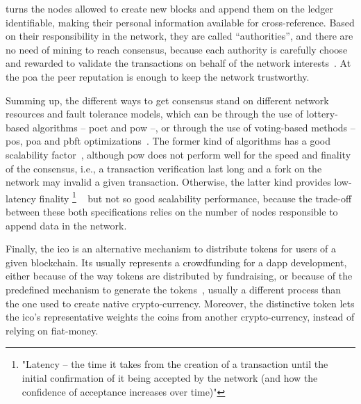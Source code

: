 \begin{description}[font={\normalfont\bfseries}]
    \item[\glsitem{poa}] turns the nodes allowed to create new blocks and append them on the ledger identifiable, making their personal information available for cross-reference.
    Based on their responsibility in the network, they are called ``authorities'', and there are no need of mining to reach consensus, because each authority is carefully choose and rewarded to validate the transactions on behalf of the network interests~\cite{LFS171x}.
    At the \gls{poa} the peer reputation is enough to keep the network trustworthy.
\end{description}

Summing up, the different ways to get consensus stand on different network resources and fault tolerance models, which can be through the use of lottery-based algorithms -- \gls{poet} and \gls{pow} --, or through the use of voting-based methods -- \gls{pos}, \gls{poa} and \gls{pbft} optimizations~\cite{hyper1}.
The former kind of algorithms has a good scalability factor~\cite{LFS171x}, although \gls{pow} does not perform well for the speed and finality of the consensus, i.e., a transaction verification last long and a fork on the network may invalid a given transaction.
Otherwise, the latter kind provides low-latency finality%
\footnote{"Latency -- the time it takes from the creation of a transaction until the initial confirmation of it being accepted by the network (and how the confidence of acceptance increases over time)"}%
~\cite{LFS171x} but not so good scalability performance, because the trade-off between these both specifications relies on the number of nodes responsible to append data in the network.

Finally, the \gls{ico} is an alternative mechanism to distribute tokens for users of a given blockchain.
Its usually represents a crowdfunding for a \gls{dapp} development,
either because of the way tokens are distributed by fundraising,
or because of the predefined mechanism to generate the tokens~\cite{pwc2016}, usually a different process than the one used to create native crypto-currency.
Moreover, the distinctive token lets the \gls{ico}'s representative weights the coins from another crypto-currency, instead of relying on fiat-money.

